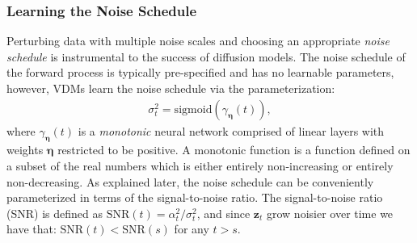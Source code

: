 \subsubsection{Learning the Noise Schedule}
\label{subsubsec: Noise Schedule}
%
Perturbing data with multiple noise scales and choosing an appropriate \textit{noise schedule} is instrumental to the success of diffusion models. The noise schedule of the forward process is typically pre-specified and has no learnable parameters, however, VDMs learn the noise schedule via the parameterization:
%
\begin{align}
    \sigma_t^2 = \mathrm{sigmoid}\left(\gamma_{\boldsymbol{\eta}}(t)\right),
\end{align}
%
where $\gamma_{\boldsymbol{\eta}}(t)$ is a \textit{monotonic} neural network comprised of linear layers with weights $\boldsymbol{\eta}$ restricted to be positive. A monotonic function is a function defined on a subset of the real numbers which is either entirely non-increasing or entirely non-decreasing. As explained later, the noise schedule can be conveniently parameterized in terms of the signal-to-noise ratio. The signal-to-noise ratio (SNR) is defined as $\mathrm{SNR}(t) = \alpha_t^2 / \sigma_t^{2}$, and since $\mathbf{z}_t$ grow noisier over time we have that: $\mathrm{SNR}(t) < \mathrm{SNR}(s)$ for any $t > s$. 

